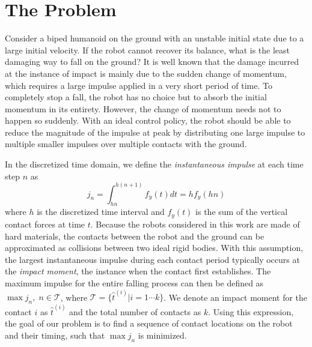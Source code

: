 \section{The Problem}
Consider a biped humanoid on the ground with an unstable initial state
due to a large initial velocity. If the robot cannot recover its
balance, what is the least damaging way to fall on the ground? It is
well known that the damage incurred at the instance of impact is
mainly due to the sudden change of momentum, which requires a large
impulse applied in a very short period of time. To completely stop a
fall, the robot has no choice but to absorb the initial momentum in
its entirety. However, the change of momentum needs not to happen so
suddenly. With an ideal control policy, the robot should be able to
reduce the magnitude of the impulse at peak by distributing one large
impulse to multiple smaller impulses over multiple contacts with the
ground.

In the discretized time domain, we define the
\emph{instantaneous impulse} at each time step $n$ as 
\begin{equation}
j_n = \int_{hn}^{h(n+1)} f_y(t) dt = h f_y(hn)
\end{equation} 
where $h$ is the
discretized time interval and $f_y(t)$ is the sum of the vertical
contact forces at time $t$. Because the robots considered in this
work are made of hard materials, the contacts between the robot and
the ground can be approximated as collisions between two ideal rigid
bodies. With this assumption, the largest instantaneous impulse during
each contact period typically occurs at the \emph{impact moment}, the
instance when the contact first establishes. The maximum impulse for
the entire falling process can then be defined as
$\max j_n, \; n\in\mathcal{T}$, where $\mathcal{T} = \{\hat{t}^{(i)}
| i = 1 \cdots k\}$. We denote an impact moment for the contact $i$
as $\hat{t}^{(i)}$ and the total number of contacts as $k$. Using this
expression, the goal of our problem is to find a sequence of contact
locations on the robot and their timing, such that $\max j_n$ is
minimized.
